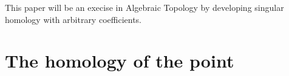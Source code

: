 \documentclass{article}
\title{\titlevar}
\author{\authorvar}
\date{\datevar}
\begin{document}
	\maketitle

	This paper will be an execise in Algebraic Topology by developing singular homology with arbitrary coefficients.

	\section{The homology of the point}

	
\end{document}
